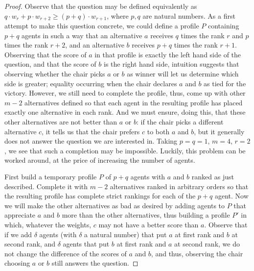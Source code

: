 \documentclass[sigconf, anonymous]{aamas}
\begin{document}
\begin{proof}
	Observe that the question may be defined equivalently as $q \cdot w_{r} + p \cdot w_{r+2} ≥ (p + q) \cdot w_{r+1}$, where $p, q$ are natural numbers. 
	As a first attempt to make this question concrete, we could define a profile $P$ containing $p+q$ agents in such a way that an alternative $a$ receives $q$ times the rank $r$ and $p$ times the rank $r+2$, and an alternative $b$ receives $p+q$ times the rank $r+1$. 
	Observing that the score of $a$ in that profile is exactly the left hand side of the question, and that the score of $b$ is the right hand side, intuition suggests that observing whether the chair picks $a$ or $b$ as winner will let us determine which side is greater; equality occurring when the chair declares $a$ and $b$ as tied for the victory. 
	However, we still need to complete the profile, thus, come up with other $m-2$ alternatives defined so that each agent in the resulting profile has placed exactly one alternative in each rank.
	And we must ensure, doing this, that these other alternatives are not better than $a$ or $b$: if the chair picks a different alternative $c$, it tells us that the chair prefers $c$ to both $a$ and $b$, 
	but it generally does not  answer the question we are interested in. 
	Taking $p = q = 1$, $m=4$, $r=2$, we see that such a completion may be impossible. Luckily, this problem can be worked around, at the price of increasing the number of agents. 
	
	First build a temporary profile $P$ of $p+q$ agents with $a$ and $b$ ranked as just described. Complete it with $m-2$ alternatives ranked in arbitrary orders so that the resulting profile has complete strict rankings for each of the $p+q$ agent. Now we will make the other alternatives as bad as desired by adding agents to $P$ that appreciate $a$ and $b$ more than the other alternatives, thus building a profile $P'$ in which, whatever the weights, $c$ may not have a better score than $a$. Observe that if we add $\delta$ agents (with $\delta$ a natural number) that put $a$ at first rank and $b$ at second rank, and $\delta$ agents that put $b$ at first rank and $a$ at second rank, we do not change the difference of the scores of $a$ and $b$, and thus, observing the chair choosing $a$ or $b$ still answers the question.
	

\end{proof}
\end{document}
